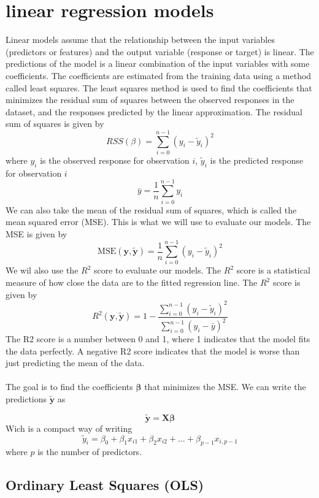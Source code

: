 \documentclass[twoside,11pt]{report}
\begin{document}
\section{linear regression models }
\label{sec:models}

Linear models assume that the relationship between the input variables (predictors or features) 
and the output variable (response or target) is linear. The predictions of the model is a linear
combination of the input variables with some coefficients. The coefficients are estimated from
the training data using a method called least squares. The least squares method is used to find
the coefficients that minimizes the residual sum of squares between the observed responses in
the dataset, and the responses predicted by the linear approximation. The residual sum of squares
is given by
$$
RSS(\beta) = \sum_{i=0}^{n-1} (y_i - \tilde{y}_i)^2
$$
where $y_i$ is the observed response for observation $i$, $\tilde{y}_i$ is the predicted response for observation $i$ 
$$
\bar{y} =  \frac{1}{n} \sum_{i=0}^{n - 1} y_i
$$
We can also take the mean of the residual sum of squares, which is called the mean squared error (MSE). This is what we will use to
evaluate our models. The MSE is given by
$$
\mbox{MSE}(\mathbf{y},\mathbf{\tilde{y}}) = \frac{1}{n}
\sum_{i=0}^{n-1}(y_i-\tilde{y}_i)^2
$$
We wil also use the $R^2$ score to evaluate our models. The $R^2$ score is a statistical measure of how close the data are 
to the fitted regression line. The $R^2$ score is given by
$$
R^2(\mathbf{y}, \tilde{\mathbf{y}}) = 1 - \frac{\sum_{i=0}^{n - 1} (y_i - \tilde{y}_i)^2}{\sum_{i=0}^{n - 1} (y_i - \bar{y})^2}
$$
The R2 score is a number between 0 and 1, where 1 indicates that the model fits the data perfectly. 
A negative R2 score indicates that the model is worse than just predicting the mean of the data.\\\\
The goal is to find the coefficients $\boldsymbol{\beta}$ that minimizes the MSE. We can write the predictions $\tilde{\mathbf{y}}$ as

$$
\tilde{\mathbf{y}} = \mathbf{X}\boldsymbol{\beta}
$$
Wich is a compact way of writing
$$
\tilde{y}_i = \beta_0 + \beta_1 x_{i1} + \beta_2 x_{i2} + \dots + \beta_{p-1} x_{i,p-1}
$$
where $p$ is the number of predictors.\\





\subsection{Ordinary Least Squares (OLS)}
\label{sec:ols}
\end{document}
